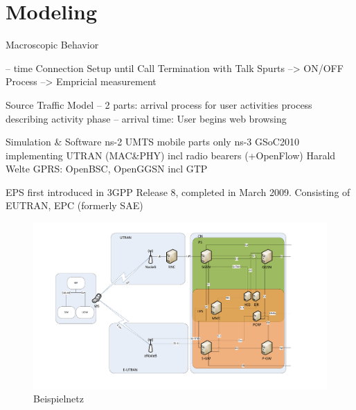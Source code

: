\section{Modeling}
Macroscopic Behavior

	-- time Connection Setup until Call Termination with Talk Spurts
	--> ON/OFF Process
	--> Empricial measurement
	
Source Traffic Model
	-- 2 parts: 
		arrival process for user activities
		process describing activity phase
	-- arrival time:
		User begins web browsing
	
Simulation \& Software
	ns-2 UMTS mobile parts only
	ns-3 GSoC2010 implementing \ac{UTRAN} (MAC\&PHY) incl radio bearers (+OpenFlow)
	Harald Welte GPRS: OpenBSC, OpenGGSN incl GTP
	

EPS first introduced in 3GPP Release 8, completed in March 2009. Consisting of EUTRAN, EPC (formerly SAE)


	


\begin{figure}[htbp]
	\centering
 	\includegraphics[width=1.0\textwidth]{images/3gpp/eps_ps-overview.pdf}
 	\caption{Beispielnetz}\label{fig:netzwerk2}
\end{figure}

